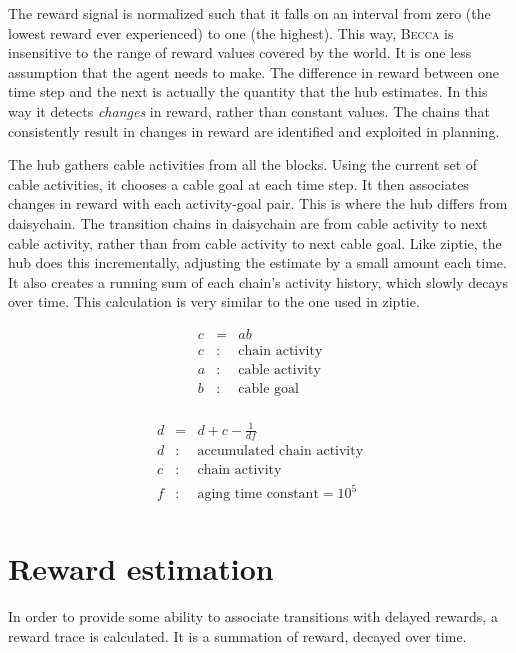 \documentclass[oneside,twocolumn]{article}
\begin{document}
The reward signal is normalized such that it falls on an interval from zero (the lowest reward ever experienced) to one (the highest). This way, \textsc{Becca} is insensitive to the range of reward values covered by the world. It is one less assumption that the agent needs to make. The  difference in reward between one time step and the next is actually the quantity that the hub estimates. In this way it detects {\em changes} in reward, rather than constant values. The chains that consistently result in changes in reward are identified and exploited in planning. 
 
The hub gathers cable activities from all the blocks. Using the current set of cable activities, it chooses a cable goal at each time step. It then associates changes in reward with each activity-goal pair. This is where the hub differs from daisychain. The transition chains in daisychain are from cable activity to next cable activity, rather than from cable activity to next cable goal. Like ziptie, the hub does this incrementally, adjusting the estimate by a small amount each time. It also creates a running sum of each chain's activity history, which slowly decays over time. This calculation is very similar to the one used in ziptie.

\begin{eqnarray*}
c &= & ab\\ 
c &:& \mbox{chain activity} \\
a &:& \mbox{cable activity} \\
b &:& \mbox{cable goal}\\
\end{eqnarray*}

\begin{eqnarray*}
d &= & d + c - \frac{1}{df}\\ 
d &:& \mbox{accumulated chain activity} \\
c &:& \mbox{chain activity} \\
f &:& \mbox{aging time constant} = 10^5 \\
\end{eqnarray*}

\section*{\color{copper} Reward estimation}

In order to provide some ability to associate transitions with delayed rewards, a reward trace is calculated. It is a summation of reward, decayed over time.
\end{document}

